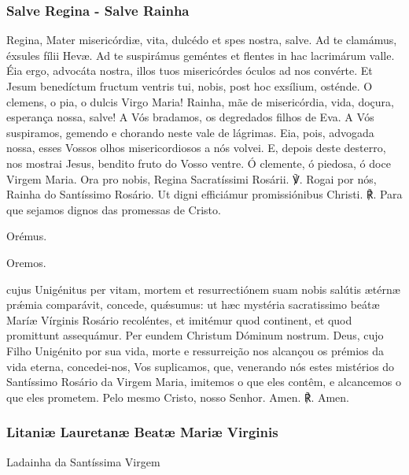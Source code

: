 \subsubsection{Salve Regina - Salve Rainha}
\begin{paracol}{2}
 Regina, Mater misericórdiæ, vita, dulcédo et spes nostra, salve. Ad te clamámus, éxsules fílii Hevæ. Ad te suspirámus geméntes et flentes in hac lacrimárum valle. Éia ergo, advocáta nostra, illos tuos misericórdes óculos ad nos convérte. Et Jesum benedíctum fructum ventris tui, nobis, post hoc exsílium, osténde. O clemens, o pia, o dulcis Virgo Maria!
\switchcolumn
{} Rainha, mãe de misericórdia, vida, doçura, esperança nossa, salve! A Vós bradamos, os degredados filhos de Eva. A Vós suspiramos, gemendo e chorando neste vale de lágrimas. Eia, pois, advogada nossa, esses Vossos olhos misericordiosos a nós volvei. E, depois deste desterro, nos mostrai Jesus, bendito fruto do Vosso ventre. Ó clemente, ó piedosa, ó doce Virgem Maria.
 Ora pro nobis, Regina Sacratíssimi Rosárii.
\switchcolumn
{\redx ℣.} Rogai por nós, Rainha do Santíssimo Rosário.
 Ut digni efficiámur promissiónibus Christi.
\switchcolumn
{\redx ℟.} Para que sejamos dignos das promessas de Cristo.
\switchcolumn*
\begin{nscenter} {\redx Orémus.} \end{nscenter}
\switchcolumn
\begin{nscenter} {\redx Oremos.} \end{nscenter}
\switchcolumn*
{} cujus Unigénitus per vitam, mortem et resurrectiónem suam nobis salútis ætérnæ prǽmia comparávit, concede, quǽsumus: ut hæc mystéria sacratissimo beátæ Maríæ Vírginis Rosário recoléntes, et imitémur quod continent, et quod promittunt assequámur. Per eundem Christum Dóminum
nostrum.
\switchcolumn
{} Deus, cujo Filho Unigénito por sua vida, morte e ressurreição nos alcançou os prémios da vida eterna, concedei-nos, Vos suplicamos, que, venerando nós estes mistérios do Santíssimo Rosário da Virgem Maria, imitemos o que eles contêm, e alcancemos o que eles prometem. Pelo mesmo Cristo, nosso Senhor.
 Amen.
\switchcolumn
{\redx ℟.} Amen.
\end{paracol}

\newpage

\subsubsection{Litaniæ Lauretanæ Beatæ Mariæ Virginis}
\begin{nscenter}Ladainha da Santíssima Virgem\end{nscenter}

